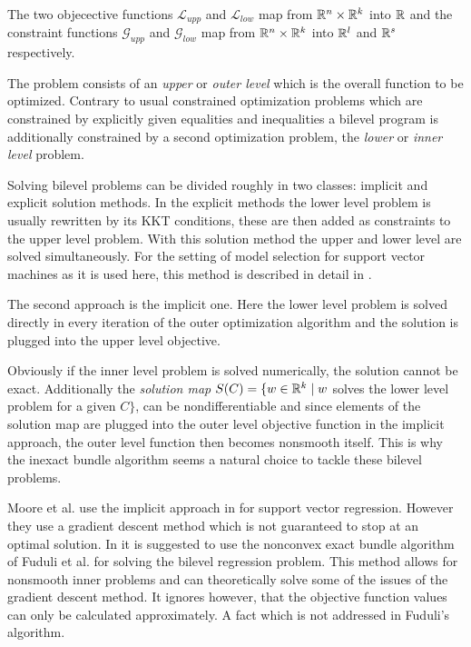 The two objecective functions \(\mathcal{L}_{upp}\) and \(\mathcal{L}_{low}\) map from \(\mathbb{R}^n\times\mathbb{R}^k\) into \(\mathbb{R}\) and the constraint functions \(\mathcal{G}_{upp}\) and \(\mathcal{G}_{low}\) map from \(\mathbb{R}^n\times\mathbb{R}^k\) into \(\mathbb{R}^l\) and \(\mathbb{R}^s\) respectively. 

The problem consists of an \emph{upper} or \emph{outer level} which is the overall function to be optimized. Contrary to usual constrained optimization problems which are constrained by explicitly given equalities and inequalities a  bilevel program is additionally constrained by a second optimization problem, the \emph{lower} or \emph{inner level} problem.

Solving bilevel problems can be divided roughly in two classes: implicit and explicit solution methods. 
In the explicit methods the lower level problem is usually rewritten by its KKT conditions, these are then added as constraints to the upper level problem. With this solution method the upper and lower level are solved simultaneously. For the setting of model selection for support vector machines as it is used here, this method is described in detail in \cite{Kunapuli2008}.

The second approach is the implicit one. Here the lower level problem is solved directly in every iteration of the outer optimization algorithm and the solution is plugged into the upper level objective. 

Obviously if the inner level problem is solved numerically, the solution cannot be exact. Additionally the \emph{solution map} \( S(C) = \{w\in \mathbb{R}^k \mid w\) solves the lower level problem for a given \(C\}\), can be nondifferentiable \cite{Outrata1998} and since elements of  the solution map are plugged into the outer level objective function in the implicit approach, the outer level function then becomes nonsmooth itself. This is why the inexact bundle algorithm seems a natural choice to tackle these bilevel problems. 

Moore et al. use the implicit approach in \cite{Moore2011} for support vector regression. However they use a gradient descent method which is not guaranteed to stop at an optimal solution.
In \cite{Moore2010a} it is suggested to use the nonconvex exact bundle algorithm of Fuduli et al. \cite{Fuduli2004a} for solving the bilevel regression problem. This method allows for nonsmooth inner problems and can theoretically solve some of the issues of the gradient descent method. It ignores however, that the objective function values can only be calculated approximately. A fact which is not addressed in Fuduli's algorithm.

